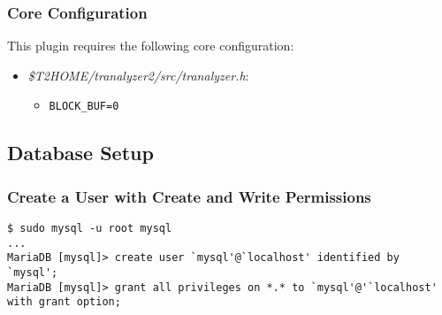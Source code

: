 \documentclass[documentation]{subfiles}
\begin{document}
\subsubsection{Core Configuration}
This plugin requires the following core configuration:
\begin{itemize}
    \item {\em \$T2HOME/tranalyzer2/src/tranalyzer.h}:
        \begin{itemize}
            \item {\tt BLOCK\_BUF=0}
        \end{itemize}
\end{itemize}

\subsection{Database Setup}

\subsubsection{Create a User with Create and Write Permissions}
\begin{verbatim}
$ sudo mysql -u root mysql
...
MariaDB [mysql]> create user `mysql'@`localhost' identified by `mysql';
MariaDB [mysql]> grant all privileges on *.* to `mysql'@'`localhost' with grant option;
\end{verbatim}
\end{document}
